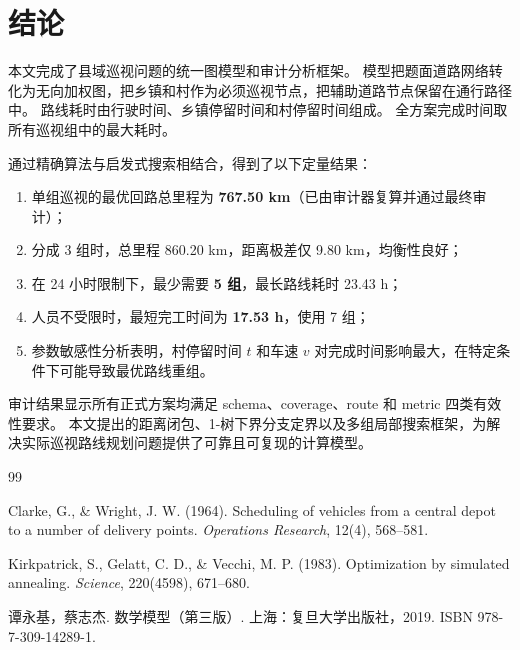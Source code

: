 \documentclass[a4paper, 12pt]{article}
\begin{document}
\section{结论}

本文完成了县域巡视问题的统一图模型和审计分析框架。
模型把题面道路网络转化为无向加权图，把乡镇和村作为必须巡视节点，把辅助道路节点保留在通行路径中。
路线耗时由行驶时间、乡镇停留时间和村停留时间组成。
全方案完成时间取所有巡视组中的最大耗时。

通过精确算法与启发式搜索相结合，得到了以下定量结果：
\begin{enumerate}[leftmargin=2em]
    \item 单组巡视的最优回路总里程为 \textbf{767.50 km}（已由审计器复算并通过最终审计）；
    \item 分成 3 组时，总里程 860.20 km，距离极差仅 9.80 km，均衡性良好；
    \item 在 24 小时限制下，最少需要 \textbf{5 组}，最长路线耗时 23.43 h；
    \item 人员不受限时，最短完工时间为 \textbf{17.53 h}，使用 7 组；
    \item 参数敏感性分析表明，村停留时间 $t$ 和车速 $v$ 对完成时间影响最大，在特定条件下可能导致最优路线重组。
\end{enumerate}

审计结果显示所有正式方案均满足 schema、coverage、route 和 metric 四类有效性要求。
本文提出的距离闭包、1-树下界分支定界以及多组局部搜索框架，为解决实际巡视路线规划问题提供了可靠且可复现的计算模型。

\begin{thebibliography}{99}

Clarke, G., \& Wright, J. W. (1964).
Scheduling of vehicles from a central depot to a number of delivery points.
\textit{Operations Research}, 12(4), 568--581.

Kirkpatrick, S., Gelatt, C. D., \& Vecchi, M. P. (1983).
Optimization by simulated annealing.
\textit{Science}, 220(4598), 671--680.

谭永基，蔡志杰.
数学模型（第三版）.
上海：复旦大学出版社，2019.
ISBN 978-7-309-14289-1.

\end{thebibliography}
\end{document}
